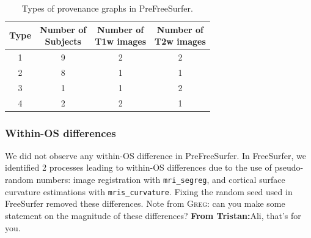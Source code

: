 \documentclass[a4paper,num-refs]{oup-contemporary}
\newcommand{\note}[2]{\color{blue}Note from \textsc{#1}: #2\color{black}}
\newcommand{\tristan}[1]{\color{orange}\textbf{From Tristan:}#1\color{black}}
\begin{document}
\begin{table}[b]
  \centering
  \begin{threeparttable}
  \caption{Types of provenance graphs in PreFreeSurfer.}
  \label{table:data-clusters}
  \begin{tabular}{cc|cc}
  \toprule
  Type   &   \makecell{Number of \\ Subjects}   &  \makecell{Number of \\ T1w images}          & \makecell{Number of \\ T2w images}   \\ \midrule
  1      &               9                      &  2 & 2 \\
  2      &               8                      &  1 & 1 \\
  3      &               1                      &  1 & 2 \\
  4      &               2                      &  2 & 1\\
  \bottomrule
  \end{tabular}
  \end{threeparttable}
  \end{table}

\subsubsection{Within-OS differences}

We did not observe any within-OS difference in PreFreeSurfer. In
FreeSurfer, we identified 2 processes leading to within-OS differences due
to the use of pseudo-random numbers: image registration with
\texttt{mri\_segreg}, and cortical surface curvature estimations with
\texttt{mris\_curvature}. Fixing the random seed used in FreeSurfer removed
these differences. \note{Greg}{can you make some statement on the magnitude of these differences?} \tristan{Ali, that's for you.}
\end{document}

